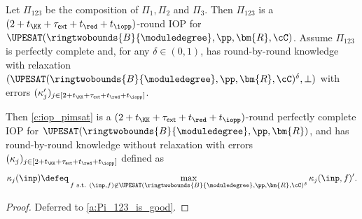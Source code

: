 \begin{lemma}\label{l:Pi_123_is_good}
Let $\Pi_{123}$ be the composition of $\Pi_1,\Pi_2$ and $\Pi_3$.  Then $\Pi_{123}$ is a $(2+t_\KK + \tau_{\mathsf{ext}} +t_\red + t_\iopp)$-round IOP for $\UPESAT(\ringtwobounds{B}{\moduledegree}, \pp,\bm{R}, \cC)$. Assume $\Pi_{123}$ is perfectly complete and, for any $\delta\in (0,1)$,  has round-by-round knowledge with relaxation $(\UPESAT(\ringtwobounds{B}{\moduledegree}, \pp,\bm{R}, \cC)^\delta, \bot)$ with errors $(\kappa_j')_{j\in [2+t_\KK + \tau_{\mathsf{ext}} +t_\red + t_\iopp]}$. 

Then \cref{c:iop_pimsat} is a $(2+t_\KK + \tau_{\mathsf{ext}} +t_\red + t_\iopp)$-round perfectly complete IOP for $\UPESAT(\ringtwobounds{B}{\moduledegree}, \pp,\bm{R})$,  and has  round-by-round knowledge without relaxation with errors $(\kappa_j)_{j\in [2+t_\KK + \tau_{\mathsf{ext}} +t_\red + t_\iopp]}$ defined as
%
$$
\kappa_j(\inp) \defeq \max_{f \text{ s.t. } (\inp,f)\not\in \UPESAT(\ringtwobounds{B}{\moduledegree}, \pp,\bm{R}, \cC)^\delta} \kappa_j(\inp, f)'.
$$
\end{lemma}
\begin{proof}
    Deferred to \cref{a:Pi_123_is_good}.
\end{proof}

